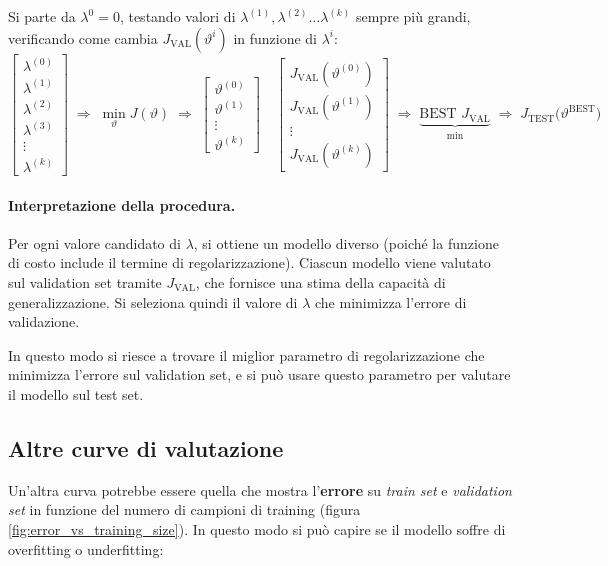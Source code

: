 Si parte da $\lambda^0 = 0$, testando valori di $\lambda^{(1)}, \lambda^{(2)} \ldots \lambda^{(k)}$ sempre più grandi, verificando come cambia $J_{\text{VAL}}(\vartheta^i)$ in funzione di $\lambda^i$:
\[
\left[
\begin{array}{c}
\lambda^{(0)}\\
\lambda^{(1)}\\
\lambda^{(2)}\\
\lambda^{(3)}\\
\vdots\\
\lambda^{(k)}
\end{array}
\right]
\;\Rightarrow\;
\min_{\vartheta} J(\vartheta)
\;\Rightarrow\;
\left[
\begin{array}{c}
\vartheta^{(0)}\\
\vartheta^{(1)}\\
\vdots \\
\vartheta^{(k)}
\end{array}
\right]
\quad
\left[
\begin{array}{c}
J_{\text{VAL}}(\vartheta^{(0)})\\
J_{\text{VAL}}(\vartheta^{(1)})\\
\vdots \\
J_{\text{VAL}}(\vartheta^{(k)})
\end{array}
\right]
\;\Rightarrow\;
\underbrace{\text{BEST } J_{\text{VAL}}}_{\text{min}}
\;\Rightarrow\;
J_{\text{TEST}}\!\big(\vartheta^{\text{BEST}}\big)
\]

\paragraph{Interpretazione della procedura.}  
Per ogni valore candidato di $\lambda$, si ottiene un modello diverso (poiché la funzione di costo include il termine di regolarizzazione). Ciascun modello viene valutato sul validation set tramite $J_{\text{VAL}}$, che fornisce una stima della capacità di generalizzazione. Si seleziona quindi il valore di $\lambda$ che minimizza l'errore di validazione. 

In questo modo si riesce a trovare il miglior parametro di regolarizzazione che minimizza l'errore sul validation set, e si può usare questo parametro per valutare il modello sul test set.

\subsection{Altre curve di valutazione}
Un'altra curva potrebbe essere quella che mostra l'\textbf{errore} su \emph{train set} e \emph{validation set} in funzione del numero di campioni di training (figura \ref{fig:error_vs_training_size}). In questo modo si può capire se il modello soffre di overfitting o underfitting:

